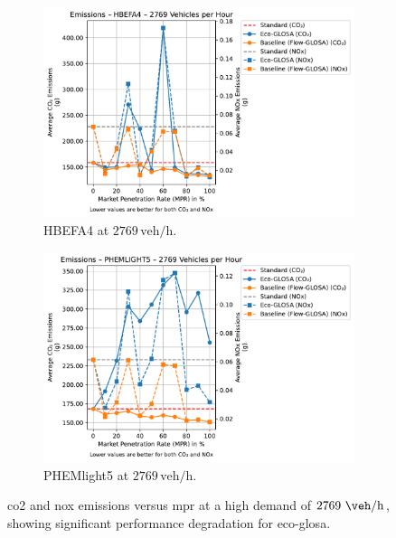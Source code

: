\begin{figure}[htb]
  \centering
  \begin{subfigure}[b]{0.45\textwidth}
    \includegraphics[width=\textwidth]{data/img/Emissions/Emissions_HBEFA4_Cars2769.pdf}
    \caption{HBEFA4 at $2769\,\mathrm{veh/h}$.}
    \label{fig:Emis_2769_HBEFA4}
  \end{subfigure}\hfill
  \begin{subfigure}[b]{0.45\textwidth}
    \includegraphics[width=\textwidth]{data/img/Emissions/Emissions_PHEMLIGHT5_Cars2769.pdf}
    \caption{PHEMlight5 at $2769\,\mathrm{veh/h}$.}
    \label{fig:Emis_2769_PHEM}
  \end{subfigure}
  \caption[\ac{co2} and \ac{nox} emissions vs. \ac{mpr} at $2769~\unit{\veh\per\hour}$]{\ac{co2} and \ac{nox} emissions versus \ac{mpr} at a high demand of $2769~\unit{\veh\per\hour}$, showing significant performance degradation for \ac{eco-glosa}.}
  \label{fig:Emis_2769}
\end{figure}

